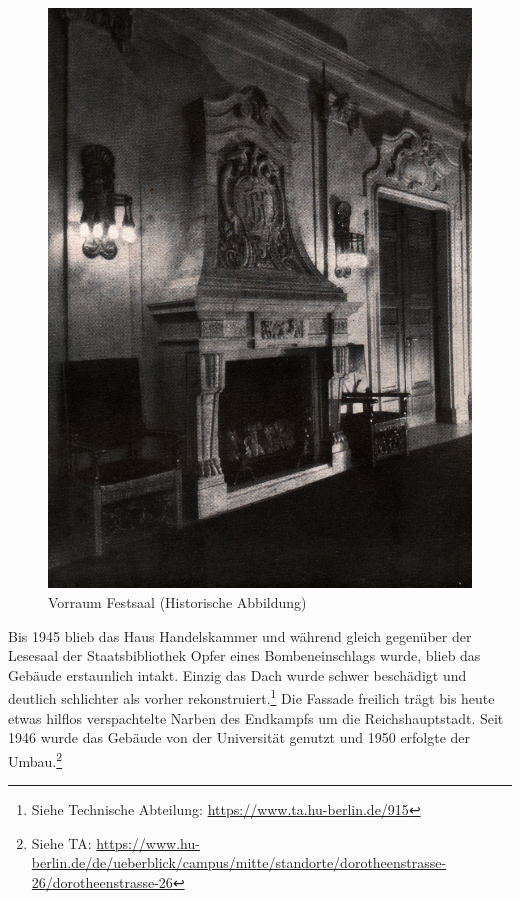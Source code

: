 \documentclass[a4paper,
fontsize=11pt,
oneside,
numbers=noperiodatend,
parskip=half-,
bibliography=totoc,
final
]{scrartcl}
\begin{document}
\begin{figure}
\centering
\includegraphics{img/vorraum.jpg}
\caption{Vorraum Festsaal (Historische Abbildung)}
\end{figure}

Bis 1945 blieb das Haus Handelskammer und während gleich gegenüber der
Lesesaal der Staatsbibliothek Opfer eines Bombeneinschlags wurde, blieb
das Gebäude erstaunlich intakt. Einzig das Dach wurde schwer beschädigt
und deutlich schlichter als vorher rekonstruiert.\footnote{Siehe
  Technische Abteilung: \url{https://www.ta.hu-berlin.de/915}} Die
Fassade freilich trägt bis heute etwas hilflos verspachtelte Narben des
Endkampfs um die Reichshauptstadt. Seit 1946 wurde das Gebäude von der
Universität genutzt und 1950 erfolgte der Umbau.\footnote{Siehe TA:
  \url{https://www.hu-berlin.de/de/ueberblick/campus/mitte/standorte/dorotheenstrasse-26/dorotheenstrasse-26}}
\end{document}
